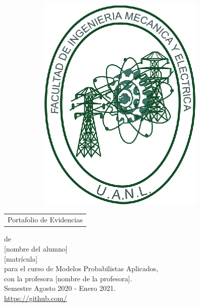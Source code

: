\begin{scshape}
\begin{center}
\begin{figure}[h!]
\begin{subfigure}{0.2\linewidth}
			\includegraphics[width=\linewidth]{Figuras/fime}
		\end{subfigure}
	\end{figure}
	\vskip16mm
	\begin{tabular}{p{11cm}}
		\centering
		{\large Portafolio de Evidencias}
	\end{tabular}
	\vskip7mm
	{de}\\[7mm]
	{\large [nombre del alumno]}\\[3mm]
	{[matrícula]}\\[7 mm]
	{para el curso de Modelos Probabilistas Aplicados,}\\[3mm]
	{con la profesora [nombre de la profesora].}\\[3mm]
	Semestre Agosto 2020 - Enero 2021. \\ [5 mm]
	\url{https://github.com/}
	\vfill
\end{center}
\end{scshape}
